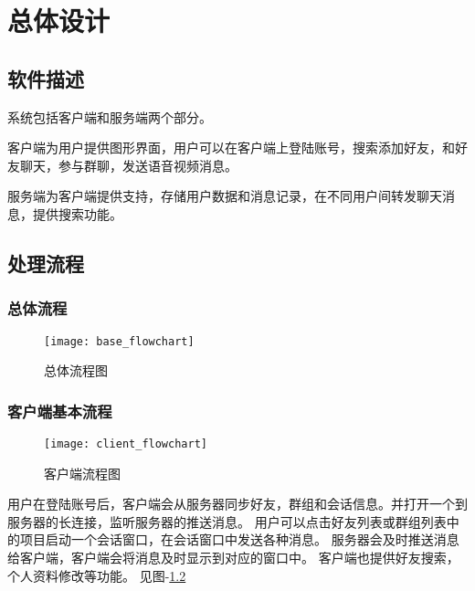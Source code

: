 \chapter{总体设计}
\section{软件描述}


系统包括客户端和服务端两个部分。

客户端为用户提供图形界面，用户可以在客户端上登陆账号，搜索添加好友，和好友聊天，参与群聊，发送语音视频消息。

服务端为客户端提供支持，存储用户数据和消息记录，在不同用户间转发聊天消息，提供搜索功能。

\section{处理流程}
\subsection{总体流程}

\begin{figure}[h]
	\centering
	\texttt{[image: base\_flowchart]}
	\caption{总体流程图} \label{fig:base_flowchart}
\end{figure}


\subsection{客户端基本流程}
\begin{figure}[h]
	\centering
	\texttt{[image: client\_flowchart]}
	\caption{客户端流程图} \label{fig:client_flowchart}
\end{figure}
用户在登陆账号后，客户端会从服务器同步好友，群组和会话信息。并打开一个到服务器的长连接，监听服务器的推送消息。
用户可以点击好友列表或群组列表中的项目启动一个会话窗口，在会话窗口中发送各种消息。
服务器会及时推送消息给客户端，客户端会将消息及时显示到对应的窗口中。
客户端也提供好友搜索，个人资料修改等功能。
见图-\ref{fig:client_flowchart}

